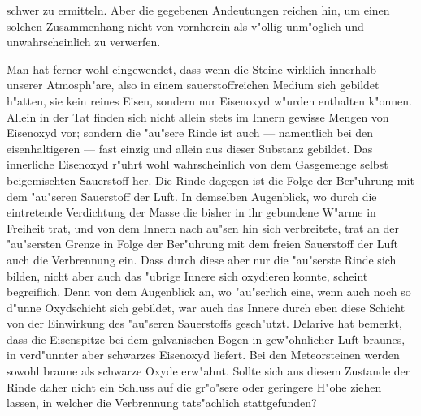 \documentclass[a4paper, 8pt, oneside, polutonikogreek, german]{article}
\begin{document}
schwer zu ermitteln. Aber die gegebenen Andeutungen reichen hin, um einen solchen Zusammenhang nicht von vornherein als v"ollig unm"oglich und unwahrscheinlich zu verwerfen.

Man hat ferner wohl eingewendet, dass wenn die Steine wirklich innerhalb unserer Atmosph"are, also in einem sauerstoffreichen Medium sich gebildet h"atten, sie kein reines Eisen, sondern nur Eisenoxyd w"urden enthalten k"onnen. Allein in der Tat finden sich nicht allein stets im Innern gewisse Mengen von Eisenoxyd vor; sondern die "au"sere Rinde ist auch --- namentlich bei den eisenhaltigeren --- fast einzig und allein aus dieser Substanz gebildet. Das innerliche Eisenoxyd r"uhrt wohl wahrscheinlich von dem Gasgemenge selbst beigemischten Sauerstoff her. Die Rinde dagegen ist die Folge der Ber"uhrung mit dem "au"seren Sauerstoff der Luft. In demselben Augenblick, wo durch die eintretende Verdichtung der Masse die bisher in ihr gebundene W"arme in Freiheit trat, und von dem Innern nach au"sen hin sich verbreitete, trat an der "au"sersten Grenze in Folge der Ber"uhrung mit dem freien Sauerstoff der Luft auch die Verbrennung ein. Dass durch diese aber nur die "au"serste Rinde sich bilden, nicht aber auch das "ubrige Innere sich oxydieren konnte, scheint begreiflich. Denn von dem Augenblick an, wo "au"serlich eine, wenn auch noch so d"unne Oxydschicht sich gebildet, war auch das Innere durch eben diese Schicht von der Einwirkung des "au"seren Sauerstoffs gesch"utzt. Delarive hat bemerkt, dass die Eisenspitze bei dem galvanischen Bogen in gew"ohnlicher Luft braunes, in verd"unnter aber schwarzes Eisenoxyd liefert. Bei den Meteorsteinen werden sowohl braune als schwarze Oxyde erw"ahnt. Sollte sich aus diesem Zustande der Rinde daher nicht ein Schluss auf die gr"o"sere oder geringere H"ohe ziehen lassen, in welcher die Verbrennung tats"achlich stattgefunden?
\end{document}
